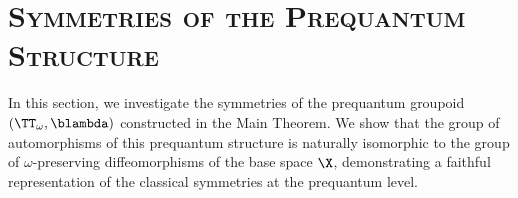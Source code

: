   
  \section{\textsc{\textbf{Symmetries of the Prequantum Structure}}}
  \label{sec:Symmetries of the Prequantum Structure}
  
  In this section,
  we investigate the symmetries of the prequantum groupoid $(\TT_\omega, \blambda)$ constructed in the Main Theorem.
  We show that the group of automorphisms of this prequantum structure is naturally isomorphic to the group of $\omega$-preserving diffeomorphisms of the base space $\X$,
  demonstrating a faithful representation of the classical symmetries at the prequantum level.
  
  
  
